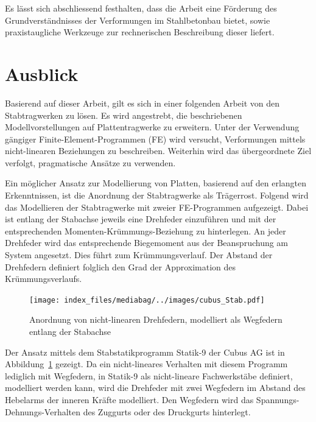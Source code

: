 \documentclass[
  12pt,
  letterpaper,
  egregdoesnotlikesansseriftitles]{scrreprt}
\begin{document}
Es lässt sich abschliessend festhalten, dass die Arbeit eine Förderung
des Grundverständnisses der Verformungen im Stahlbetonbau bietet, sowie
praxistaugliche Werkzeuge zur rechnerischen Beschreibung dieser liefert.

\hypertarget{ausblick}{%
\section{Ausblick}\label{ausblick}}

Basierend auf dieser Arbeit, gilt es sich in einer folgenden Arbeit von
den Stabtragwerken zu lösen. Es wird angestrebt, die beschriebenen
Modellvorstellungen auf Plattentragwerke zu erweitern. Unter der
Verwendung gängiger Finite-Element-Programmen (FE) wird versucht,
Verformungen mittels nicht-linearen Beziehungen zu beschreiben.
Weiterhin wird das übergeordnete Ziel verfolgt, pragmatische Ansätze zu
verwenden.

Ein möglicher Ansatz zur Modellierung von Platten, basierend auf den
erlangten Erkenntnissen, ist die Anordnung der Stabtragwerke als
Trägerrost. Folgend wird das Modellieren der Stabtragwerke mit zweier
FE-Programmen aufgezeigt. Dabei ist entlang der Stabachse jeweils eine
Drehfeder einzuführen und mit der entsprechenden
Momenten-Krümmungs-Beziehung zu hinterlegen. An jeder Drehfeder wird das
entsprechende Biegemoment aus der Beanspruchung am System angesetzt.
Dies führt zum Krümmungsverlauf. Der Abstand der Drehfedern definiert
folglich den Grad der Approximation des Krümmungsverlaufs.

\begin{figure}[H]

{\centering \texttt{[image: index\_files/mediabag/../images/cubus\_Stab.pdf]}

}

\caption{\label{fig-cubus_stab}Anordnung von nicht-linearen Drehfedern,
modelliert als Wegfedern entlang der Stabachse}

\end{figure}

Der Ansatz mittels dem Stabstatikprogramm Statik-9 der Cubus AG ist in
Abbildung~\ref{fig-cubus_stab} gezeigt. Da ein nicht-lineares Verhalten
mit diesem Programm lediglich mit Wegfedern, in Statik-9 als
nicht-lineare Fachwerkstäbe definiert, modelliert werden kann, wird die
Drehfeder mit zwei Wegfedern im Abstand des Hebelarms der inneren Kräfte
modelliert. Den Wegfedern wird das Spannungs-Dehnungs-Verhalten des
Zuggurts oder des Druckgurts hinterlegt.
\end{document}
